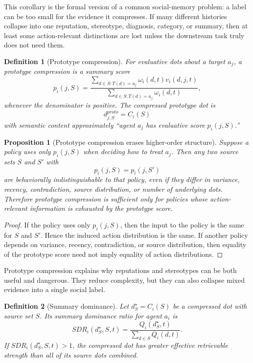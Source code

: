 \documentclass[11pt]{article}
\newtheorem{definition}{Definition}
\newtheorem{proposition}{Proposition}
\theoremstyle{remark}
\begin{document}
This corollary is the formal version of a common social-memory problem:
a label can be too small for the evidence it compresses. If many
different histories collapse into one reputation, stereotype, diagnosis,
category, or summary, then at least some action-relevant distinctions
are lost unless the downstream task truly does not need them.

\begin{definition}[Prototype compression]\label{def:prototype-compression}
For evaluative dots about a target $a_j$, a prototype compression is a
summary score
$$
p_i(j,S)=\frac{\sum_{d\in S:T(d)=a_j}\omega_i(d,t)v_i(d,j,t)}
{\sum_{d\in S:T(d)=a_j}\omega_i(d,t)},
$$
whenever the denominator is positive. The compressed prototype dot is
$$
d_{j,S}^{proto}=C_i(S)
$$
with semantic content approximately ``agent $a_j$ has evaluative score
$p_i(j,S)$.''
\end{definition}

\begin{proposition}[Prototype compression erases higher-order structure]\label{prop:prototype-erases-structure}
Suppose a policy uses only $p_i(j,S)$ when deciding how to treat $a_j$.
Then any two source sets $S$ and $S'$ with
$$
p_i(j,S)=p_i(j,S')
$$
are behaviorally indistinguishable to that policy, even if they differ in
variance, recency, contradiction, source distribution, or number of
underlying dots. Therefore prototype compression is sufficient only for
policies whose action-relevant information is exhausted by the prototype
score.
\end{proposition}

\begin{proof}
If the policy uses only $p_i(j,S)$, then the input to the policy is the
same for $S$ and $S'$. Hence the induced action distribution is the
same. If another policy depends on variance, recency, contradiction, or
source distribution, then equality of the prototype score need not imply
equality of action distributions.
\end{proof}

Prototype compression explains why reputations and stereotypes can be
both useful and dangerous. They reduce complexity, but they can also
collapse mixed evidence into a single social label.

\begin{definition}[Summary dominance]\label{def:summary-dominance}
Let $d_S^\star=C_i(S)$ be a compressed dot with source set $S$. Its
summary dominance ratio for agent $a_i$ is
$$
SDR_i(d_S^\star,S,t)=\frac{Q_i(d_S^\star,t)}{\sum_{d\in S}Q_i(d,t)}.
$$
If $SDR_i(d_S^\star,S,t)>1$, the compressed dot has greater effective
retrievable strength than all of its source dots combined.
\end{definition}
\end{document}
